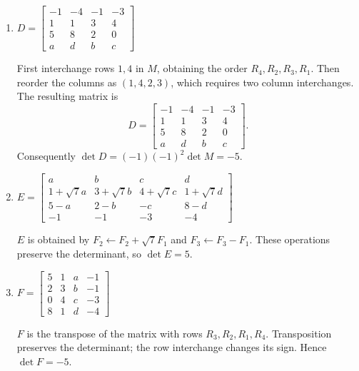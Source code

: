 \begin{enumerate}[label=\alph*)]
\begin{answer}
$C$ has rows $R_2,R_4,R_3,R_1$.
One way to obtain this order is to interchange positions $1,2$, then $2,4$.
Two interchanges give $\det C=\det M=5$.
\end{answer}

\item $D=\begin{bmatrix}-1&-4&-1&-3\\1&1&3&4\\5&8&2&0\\a&d&b&c\end{bmatrix}$

\begin{answer}
First interchange rows $1,4$ in $M$, obtaining the order $R_4,R_2,R_3,R_1$.
Then reorder the columns as $(1,4,2,3)$, which requires two column interchanges.
The resulting matrix is
\[
 D=\begin{bmatrix}-1&-4&-1&-3\\1&1&3&4\\5&8&2&0\\a&d&b&c\end{bmatrix}.
\]
Consequently $\det D=(-1)(-1)^2\det M=-5$.
\end{answer}

\item $E=\begin{bmatrix}a&b&c&d\\1+\sqrt7a&3+\sqrt7b&4+\sqrt7c&1+\sqrt7d\\5-a&2-b&-c&8-d\\-1&-1&-3&-4\end{bmatrix}$

\begin{answer}
$E$ is obtained by $F_2\gets F_2+\sqrt7F_1$ and
$F_3\gets F_3-F_1$. These operations preserve the determinant, so $\det E=5$.
\end{answer}

\item $F=\begin{bmatrix}5&1&a&-1\\2&3&b&-1\\0&4&c&-3\\8&1&d&-4\end{bmatrix}$

\begin{answer}
$F$ is the transpose of the matrix with rows $R_3,R_2,R_1,R_4$.
Transposition preserves the determinant; the row interchange changes its sign.
Hence $\det F=-5$.
\end{answer}
\end{enumerate}
